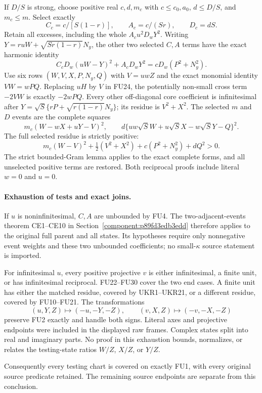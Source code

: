 If $D/S$ is strong, choose positive real $c,d,m_c$ with
$c\le c_0,a_0$, $d\le D/S$, and $m_c\le m$. Select exactly
\[
 C_c=c/[S(1-r)],\qquad A_c=c/(Sr),\qquad D_c=dS.
 \tag{FU27}
\]
Retain all excesses, including the whole $A_cu^2D_wY^2$.
Writing $Y=ruW+\sqrt{Sr(1-r)}N_y$, the other two selected
$C,A$ terms have the exact harmonic identity
\[
 C_cD_w(uW-Y)^2+A_cD_wY^2=cD_w(P^2+N_y^2).
 \tag{FU28}
\]
Use six rows $(W,V,X,P,N_y,Q)$ with $V=uwZ$ and the exact
monomial identity $VW=wPQ$. Replacing $uH$ by $V$ in FU24,
the potentially non-small cross term $-2VW$ is exactly $-2wPQ$.
Every other off-diagonal core coefficient is infinitesimal after
$Y=\sqrt S\{rP+\sqrt{r(1-r)}N_y\}$; its residue is $V^2+X^2$.
The selected $m$ and $D$ events are the complete squares
\[
 m_c(W-wX+uY-V)^2,\qquad
 d\{uw\sqrt S W+u\sqrt S X-w\sqrt S Y-Q\}^2.
 \tag{FU29}
\]
The full selected residue is strictly positive:
\[
 m_c(W-V)^2+\tfrac12(V^2+X^2)+c(P^2+N_y^2)+dQ^2>0.
 \tag{FU30}
\]
The strict bounded-Gram lemma applies to the exact complete
forms, and all unselected positive terms are restored. Both
reciprocal proofs include literal $w=0$ and $u=0$.

\paragraph{Exhaustion of tests and exact joins.}
If $u$ is noninfinitesimal, $C,A$ are unbounded by FU4. The
two-adjacent-events theorem CE1--CE10 in
Section~\ref{component:p89fd3edb3edd}
therefore applies to the original full parent and all states.
Its hypotheses require only nonnegative event weights and these
two unbounded coefficients; no small-$\kappa$ source statement
is imported.

For infinitesimal $u$, every positive projective $v$ is either
infinitesimal, a finite unit, or has infinitesimal reciprocal.
FU22--FU30 cover the two end cases. A finite unit has either the
matched residue, covered by UKR1--UKR21, or a different residue,
covered by FU10--FU21. The transformations
\[
 (u,Y,Z)\mapsto(-u,-Y,-Z),\qquad
 (v,X,Z)\mapsto(-v,-X,-Z)
 \tag{FU31}
\]
preserve FU2 exactly and handle both signs. Literal axes and
projective endpoints were included in the displayed raw frames.
Complex states split into real and imaginary parts. No proof in
this exhaustion bounds, normalizes, or relates the testing-state
ratios $W/Z$, $X/Z$, or $Y/Z$.

Consequently every testing chart is covered on exactly FU1,
with every original source predicate retained. The remaining
source endpoints are separate from this conclusion.



